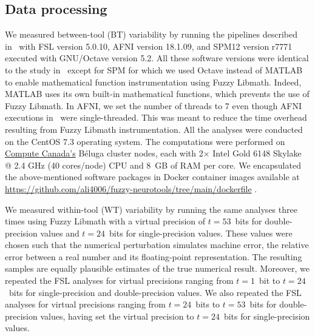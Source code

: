\documentclass[conference]{IEEEtran}
\begin{document}

\subsection{Data processing}

We measured between-tool (BT) variability by running the pipelines
described in~\cite{bowring2019exploring} with FSL version 5.0.10, AFNI
version 18.1.09, and SPM12 version r7771 executed with GNU/Octave version
5.2. All these software versions were identical to the study
in~\cite{bowring2019exploring} except for SPM for which we used Octave
instead of MATLAB to enable mathematical function instrumentation using
Fuzzy Libmath. Indeed, MATLAB uses its own built-in mathematical functions,
which prevents the use of Fuzzy Libmath. In AFNI, we set the number of
threads to 7 even though AFNI executions
in~\cite{bowring2019exploring} were single-threaded. This was meant to
reduce the time overhead resulting from Fuzzy Libmath instrumentation. All
the analyses were conducted on the CentOS 7.3 operating system. The
computations were performed on \href{https://www.computecanada.ca}{Compute
Canada's} Béluga cluster nodes, each with 2$\times$ Intel Gold 6148 Skylake
@ 2.4 GHz (40 cores/node) CPU and 8~GB of RAM per core. We encapsulated the
above-mentioned software packages in Docker container images available at
\url{https://github.com/ali4006/fuzzy-neurotools/tree/main/dockerfile}
.

We measured within-tool (WT) variability by running the same analyses three
times using Fuzzy Libmath with a virtual precision of $t=53$~bits for
double-precision values and $t=24$~bits for single-precision values. These
values were chosen such that the numerical perturbation simulates machine
error, the relative error between a real number and its floating-point
representation. The resulting samples are equally plausible estimates of
the true numerical result. Moreover, we repeated the FSL analyses for virtual
precisions ranging from $t=1$~bit to $t=24$~bits for single-precision
and double-precision values. We also repeated the FSL analyses for virtual 
precisions ranging from $t=24$~bits to $t=53$~bits for double-precision values, having 
set the virtual precision to $t=24$~bits for single-precision values. 
\end{document}
